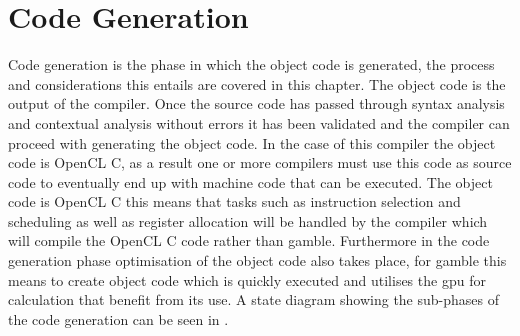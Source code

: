\chapter{Code Generation}
Code generation is the phase in which the object code is generated, the process and considerations this entails are covered in this chapter.
The object code is the output of the compiler.
Once the source code has passed through syntax analysis and contextual analysis without errors it has been validated and the compiler can proceed with generating the object code.
In the case of this compiler the object code is OpenCL C, as a result one or more compilers must use this code as source code to eventually end up with machine code that can be executed.
The object code is OpenCL C this means that tasks such as instruction selection and scheduling as well as register allocation will be handled by the compiler which will compile the OpenCL C code rather than \gls{gamble}.
Furthermore in the code generation phase optimisation of the object code also takes place, for \gls{gamble} this means to create object code which is quickly executed and utilises the \acrshort{gpu} for calculation that benefit from its use.
A state diagram showing the sub-phases of the code generation can be seen in .


